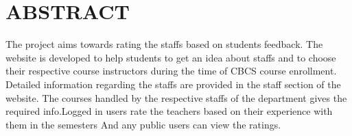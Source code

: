 \chapter*{\uppercase{ABSTRACT}}
The project aims towards rating the staffs based on students feedback.
The website is developed to help students to get an idea about staffs 
and to choose their respective course instructors during the time of 
CBCS course enrollment. Detailed information regarding the staffs  
are provided in the staff section of the website.
The courses handled by the respective staffs of the department
gives the required info.Logged in users 
rate the teachers based on their experience with them in the semesters
And any public users can view the ratings.

